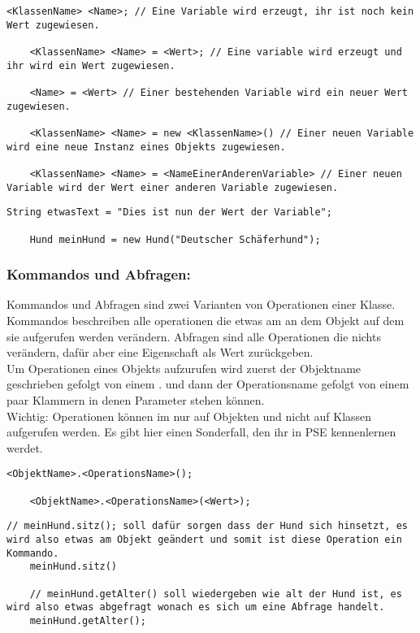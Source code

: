 \begin{lstlisting}[title=\textbf{Variablen Syntax}]
	<KlassenName> <Name>; // Eine Variable wird erzeugt, ihr ist noch kein Wert zugewiesen.

	<KlassenName> <Name> = <Wert>; // Eine variable wird erzeugt und ihr wird ein Wert zugewiesen.
	
	<Name> = <Wert> // Einer bestehenden Variable wird ein neuer Wert zugewiesen.
	
	<KlassenName> <Name> = new <KlassenName>() // Einer neuen Variable wird eine neue Instanz eines Objekts zugewiesen.
	
	<KlassenName> <Name> = <NameEinerAnderenVariable> // Einer neuen Variable wird der Wert einer anderen Variable zugewiesen. 
\end{lstlisting}
\begin{lstlisting}[title=\textbf{Variable Beispiel}]
 	String etwasText = "Dies ist nun der Wert der Variable";
 	
 	Hund meinHund = new Hund("Deutscher Schäferhund");
\end{lstlisting}

\subsubsection*{Kommandos und Abfragen:}
Kommandos und Abfragen sind zwei Varianten von Operationen einer Klasse. Kommandos beschreiben alle operationen die etwas am an dem Objekt auf dem sie aufgerufen werden verändern.
Abfragen sind alle Operationen die nichts verändern, dafür aber eine Eigenschaft als Wert zurückgeben.\\
Um Operationen eines Objekts aufzurufen wird zuerst der Objektname geschrieben gefolgt von einem . und dann der Operationsname gefolgt von einem paar Klammern in denen Parameter stehen können.\\
{\color{red} Wichtig: } Operationen können im nur auf Objekten und nicht auf Klassen aufgerufen werden.
Es  gibt hier einen Sonderfall, den ihr in PSE kennenlernen werdet.

\begin{lstlisting}[title=\textbf{Kommando/Abfrage Syntax}]
	<ObjektName>.<OperationsName>();
	
	<ObjektName>.<OperationsName>(<Wert>);
\end{lstlisting}

\begin{lstlisting}[title=\textbf{Kommando/Abfrage Beispiel}]
    // meinHund.sitz(); soll dafür sorgen dass der Hund sich hinsetzt, es wird also etwas am Objekt geändert und somit ist diese Operation ein Kommando.
  	meinHund.sitz()

	// meinHund.getAlter() soll wiedergeben wie alt der Hund ist, es wird also etwas abgefragt wonach es sich um eine Abfrage handelt.
	meinHund.getAlter();
\end{lstlisting}
